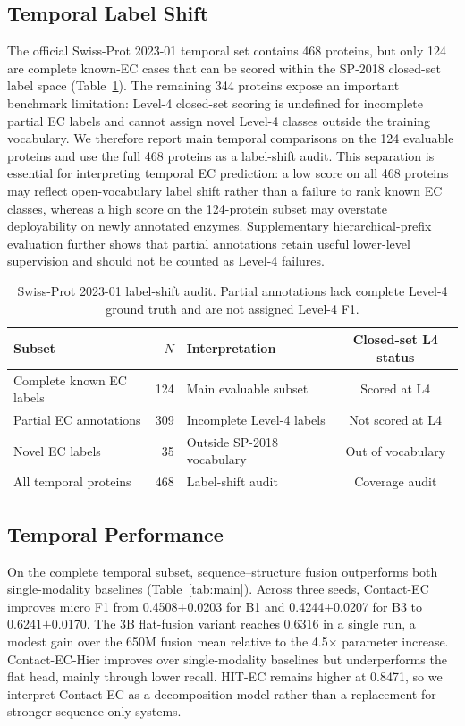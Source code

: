 \documentclass[numbered,contemporary,mediumone]{oup-authoring-template}
\begin{document}
\subsection{Temporal Label Shift}

The official Swiss-Prot 2023-01 temporal set contains 468 proteins, but only 124
are complete known-EC cases that can be scored within the SP-2018 closed-set label
space (Table~\ref{tab:labelshift}). The remaining 344 proteins expose an important
benchmark limitation: Level-4 closed-set scoring is undefined for incomplete
partial EC labels and cannot assign novel Level-4 classes outside the training
vocabulary. We therefore report main temporal
comparisons on the 124 evaluable proteins and use the full 468 proteins as a
label-shift audit. This separation is essential for interpreting temporal EC
prediction: a low score on all 468 proteins may reflect open-vocabulary label
shift rather than a failure to rank known EC classes, whereas a high score on the
124-protein subset may overstate deployability on newly annotated enzymes.
Supplementary hierarchical-prefix evaluation further shows that partial
annotations retain useful lower-level supervision and should not be counted as
Level-4 failures.

\begin{table}[!htbp]
\centering
\caption{Swiss-Prot 2023-01 label-shift audit. Partial annotations lack complete
Level-4 ground truth and are not assigned Level-4 F1.}
\label{tab:labelshift}
\setlength{\tabcolsep}{5pt}
\begin{tabular}{lrlc}
\toprule
Subset & $N$ & Interpretation & Closed-set L4 status \\
\midrule
Complete known EC labels & 124 & Main evaluable subset & Scored at L4 \\
Partial EC annotations   & 309 & Incomplete Level-4 labels & Not scored at L4 \\
Novel EC labels          & 35  & Outside SP-2018 vocabulary & Out of vocabulary \\
All temporal proteins    & 468 & Label-shift audit & Coverage audit \\
\bottomrule
\end{tabular}
\end{table}

\subsection{Temporal Performance}

On the complete temporal subset, sequence--structure fusion outperforms both
single-modality baselines (Table~\ref{tab:main}). Across three seeds, Contact-EC
improves micro F1 from 0.4508$\pm$0.0203 for B1 and 0.4244$\pm$0.0207 for B3 to
0.6241$\pm$0.0170. The 3B flat-fusion variant reaches 0.6316 in a single run, a
modest gain over the 650M fusion mean relative to the 4.5$\times$ parameter
increase. Contact-EC-Hier improves over single-modality baselines but
underperforms the flat head, mainly through lower recall. HIT-EC remains higher
at 0.8471, so we interpret Contact-EC as a decomposition model rather than a
replacement for stronger sequence-only systems.
\end{document}
